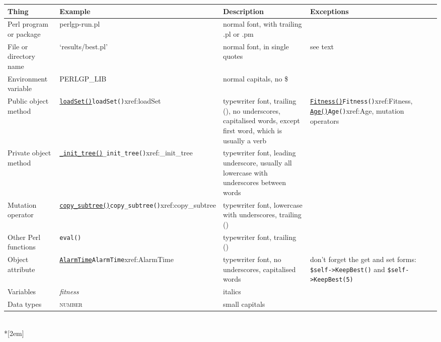 \documentclass[a4paper]{article}
\begin{document}
\renewcommand{\arraystretch}{2.0}
\begin{tabular}{l l l l}
\textbf{Thing} & \textbf{Example} & \textbf{Description} & \textbf{Exceptions} \\
\hline

\parbox[t]{0.2\textwidth}{\raggedright Perl program or package}
  & perlgp-run.pl & \parbox[t]{0.25\textwidth}{\raggedright normal font, with trailing .pl or .pm} & \\

\parbox[t]{0.2\textwidth}{\raggedright File or directory name}
  & `results/best.pl' & \parbox[t]{0.25\textwidth}{\raggedright normal font, in single quotes} & see text\\

\parbox[t]{0.2\textwidth}{\raggedright Environment variable}
  & PERLGP\_LIB & normal capitals, no \$ & \\

\parbox[t]{0.2\textwidth}{\raggedright Public object method}
  & \hyperref[no]{\texttt{loadSet()}}{\texttt{loadSet()}}{xref:loadSet}
    & \parbox[t]{0.25\textwidth}{\raggedright typewriter font, trailing (), no underscores, capitalised words, except first word, which is usually a verb}
      & \parbox[t]{0.25\textwidth}{\raggedright \hyperref[no]{\texttt{Fitness()}}{\texttt{Fitness()}}{xref:Fitness}, \hyperref[no]{\texttt{Age()}}{\texttt{Age()}}{xref:Age}, mutation operators}\\

\parbox[t]{0.2\textwidth}{\raggedright Private object method}
  & \hyperref[no]{\texttt{\_init\_tree()}}{\texttt{\_init\_tree()}}{xref:_init_tree}
    & \parbox[t]{0.25\textwidth}{\raggedright typewriter font, leading underscore, usually all lowercase with underscores between words} & \\

\parbox[t]{0.2\textwidth}{\raggedright Mutation operator}
  & \hyperref[no]{\texttt{copy\_subtree()}}{\texttt{copy\_subtree()}}{xref:copy_subtree}
    & \parbox[t]{0.25\textwidth}{\raggedright typewriter font, lowercase with underscores, trailing ()} & \\

\parbox[t]{0.2\textwidth}{\raggedright Other Perl functions}
  & \texttt{eval()}
    & \parbox[t]{0.25\textwidth}{\raggedright typewriter font, trailing ()} & \\

\parbox[t]{0.2\textwidth}{\raggedright Object attribute}
  & \hyperref[no]{\texttt{AlarmTime}}{\texttt{AlarmTime}}{xref:AlarmTime}
    & \parbox[t]{0.25\textwidth}{\raggedright typewriter font, no underscores, capitalised words}
      & \parbox[t]{0.25\textwidth}{\raggedright don't forget the get and set forms: \texttt{\$self->KeepBest()} and \texttt{\$self->KeepBest(5)}} \\

\parbox[t]{0.2\textwidth}{\raggedright Variables}
  & \textit{fitness} & italics & \\

\parbox[t]{0.2\textwidth}{\raggedright Data types}
  & \textsc{number} & small capitals & \\
\hline
\end{tabular}
\\*[2em]
\end{document}
